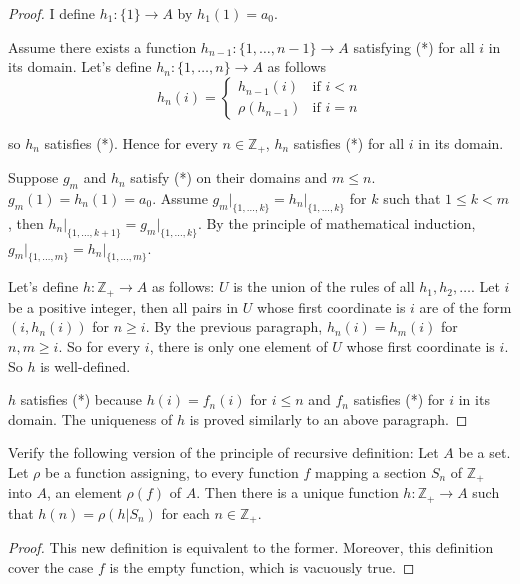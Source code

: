 \begin{proof}
    I define $h_{1}: \{ 1 \}\to A$ by $h_{1}(1) = a_{0}$.

    Assume there exists a function $h_{n-1}: \{ 1, \ldots, n-1 \}\to A$ satisfying (*) for all $i$ in its domain. Let's define $h_{n}: \{ 1, \ldots, n \}\to A$ as follows
    \[
        h_{n}(i) = \begin{cases}
            h_{n-1}(i)    & \text{if $i < n$} \\
            \rho(h_{n-1}) & \text{if $i = n$}
        \end{cases}
    \]

    so $h_{n}$ satisfies (*). Hence for every $n\in\mathbb{Z}_{+}$, $h_{n}$ satisfies (*) for all $i$ in its domain.

    Suppose $g_{m}$ and $h_{n}$ satisfy (*) on their domains and $m\leq n$. $g_{m}(1) = h_{n}(1) = a_{0}$. Assume $g_{m}\vert_{\{ 1,\ldots, k \}} = h_{n}\vert_{\{1,\ldots, k\}}$ for $k$ such that $1\leq k < m$, then $h_{n}\vert_{\{1,\ldots,k+1\}} = g_{m}\vert_{\{1,\ldots,k\}}$. By the principle of mathematical induction, $g_{m}\vert_{\{ 1,\ldots,m \}} = h_{n}\vert_{\{1,\ldots,m\}}$.

    Let's define $h: \mathbb{Z}_{+}\to A$ as follows: $U$ is the union of the rules of all $h_{1}, h_{2}, \ldots$. Let $i$ be a positive integer, then all pairs in $U$ whose first coordinate is $i$ are of the form $(i, h_{n}(i))$ for $n\geq i$. By the previous paragraph, $h_{n}(i) = h_{m}(i)$ for $n, m\geq i$. So for every $i$, there is only one element of $U$ whose first coordinate is $i$. So $h$ is well-defined.

    $h$ satisfies (*) because $h(i) = f_{n}(i)$ for $i\leq n$ and $f_{n}$ satisfies (*) for $i$ in its domain. The uniqueness of $h$ is proved similarly to an above paragraph.
\end{proof}

\begin{exercise}\label{chapter1:section8:exercise8}
    Verify the following version of the principle of recursive definition: Let $A$ be a set. Let $\rho$ be a function assigning, to every function $f$ mapping a section $S_{n}$ of $\mathbb{Z}_{+}$ into $A$, an element $\rho(f)$ of $A$. Then there is a unique function $h: \mathbb{Z}_{+}\to A$ such that $h(n) = \rho(h\vert S_{n})$ for each $n\in\mathbb{Z}_{+}$.
\end{exercise}

\begin{proof}
    This new definition is equivalent to the former. Moreover, this definition cover the case $f$ is the empty function, which is vacuously true.
\end{proof}

